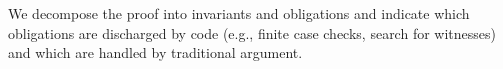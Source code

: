 We decompose the proof into invariants and obligations and indicate which obligations are discharged by code (e.g., finite case checks, search for witnesses) and which are handled by traditional argument.

